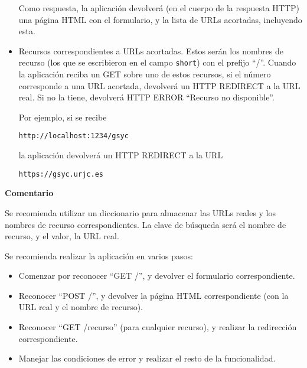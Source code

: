 \begin{itemize}
Como respuesta, la aplicación devolverá (en el cuerpo de la respuesta HTTP) una página HTML con el formulario, y la lista de URLs acortadas, incluyendo esta.


\item Recursos correspondientes a URLs acortadas. Estos serán los nombres de recurso (los que se escribieron en el campo \texttt{short}) con el prefijo ``/''. Cuando la aplicación reciba un GET sobre uno de estos recursos, si el número corresponde a una URL acortada, devolverá un HTTP REDIRECT a la URL real. Si no la tiene, devolverá HTTP ERROR ``Recurso no disponible''.

Por ejemplo, si se recibe 

\verb|http://localhost:1234/gsyc|

la aplicación devolverá un HTTP REDIRECT a la URL

\verb|https://gsyc.urjc.es|

\end{itemize}


\textbf{Comentario}

Se recomienda utilizar un diccionario para almacenar las URLs reales y los nombres de recurso correspondientes. La clave de búsqueda será el nombre de recurso, y el valor, la URL real.

Se recomienda realizar la aplicación en varios pasos:

\begin{itemize}
\item Comenzar por reconocer ``GET /'', y devolver el formulario correspondiente.
\item Reconocer ``POST /'', y devolver la página HTML correspondiente (con la URL real y el nombre de recurso).
\item Reconocer ``GET /recurso'' (para cualquier recurso), y realizar la redirección correspondiente.
\item Manejar las condiciones de error y realizar el resto de la funcionalidad.
\end{itemize}


